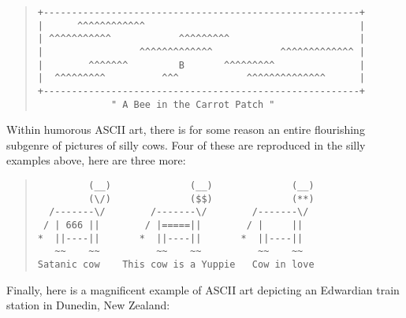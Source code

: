 \begin{figure*}
    \begin{quote}
        \begin{verbatim}
+--------------------------------------------------------+
|      ^^^^^^^^^^^^                                      |
| ^^^^^^^^^^^            ^^^^^^^^^                       |
|                 ^^^^^^^^^^^^^            ^^^^^^^^^^^^^ |
|        ^^^^^^^         B       ^^^^^^^^^               |
|  ^^^^^^^^^          ^^^            ^^^^^^^^^^^^^^      |
+--------------------------------------------------------+
             " A Bee in the Carrot Patch "
        \end{verbatim}
    \end{quote}
\end{figure*}

Within humorous ASCII art, there is for some reason an entire flourishing
subgenre of pictures of silly cows. Four of these are reproduced in the silly
examples above, here are three more:

\begin{figure*}
    \begin{quote}
        \begin{verbatim}
         (__)              (__)              (__)
         (\/)              ($$)              (**)
  /-------\/        /-------\/        /-------\/
 / | 666 ||        / |=====||        / |     ||
*  ||----||       *  ||----||       *  ||----||
   ~~    ~~          ~~    ~~          ~~    ~~
Satanic cow    This cow is a Yuppie   Cow in love
        \end{verbatim}
    \end{quote}
\end{figure*}

Finally, here is a magnificent example of ASCII art depicting an Edwardian
train station in Dunedin, New Zealand:

